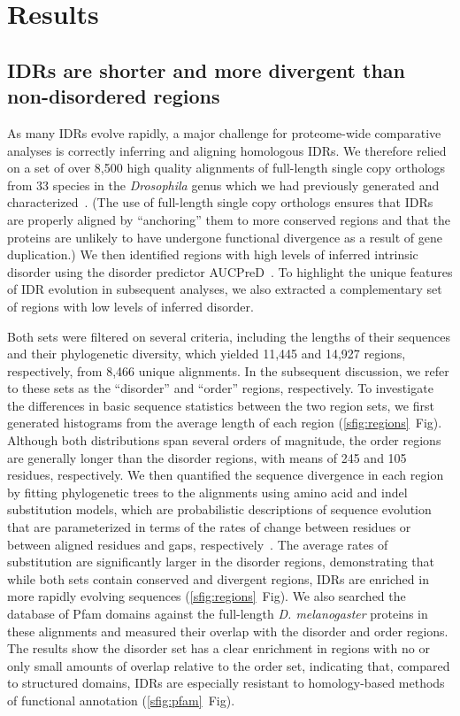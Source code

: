 \section{Results}
\subsection{IDRs are shorter and more divergent than non-disordered regions}
As many IDRs evolve rapidly, a major challenge for proteome-wide comparative analyses is correctly inferring and aligning homologous IDRs. We therefore relied on a set of over 8,500 high quality alignments of full-length single copy orthologs from 33 species in the \textit{Drosophila} genus which we had previously generated and characterized~\cite{Singleton2023}. (The use of full-length single copy orthologs ensures that IDRs are properly aligned by ``anchoring'' them to more conserved regions and that the proteins are unlikely to have undergone functional divergence as a result of gene duplication.) We then identified regions with high levels of inferred intrinsic disorder using the disorder predictor AUCPreD~\cite{Wang2016}. To highlight the unique features of IDR evolution in subsequent analyses, we also extracted a complementary set of regions with low levels of inferred disorder.

Both sets were filtered on several criteria, including the lengths of their sequences and their phylogenetic diversity, which yielded 11,445 and 14,927 regions, respectively, from 8,466 unique alignments. In the subsequent discussion, we refer to these sets as the ``disorder'' and ``order'' regions, respectively. To investigate the differences in basic sequence statistics between the two region sets, we first generated histograms from the average length of each region (\ref{sfig:regions}~Fig). Although both distributions span several orders of magnitude, the order regions are generally longer than the disorder regions, with means of 245 and 105 residues, respectively. We then quantified the sequence divergence in each region by fitting phylogenetic trees to the alignments using amino acid and indel substitution models, which are probabilistic descriptions of sequence evolution that are parameterized in terms of the rates of change between residues or between aligned residues and gaps, respectively~\cite{Kapli2020}. The average rates of substitution are significantly larger in the disorder regions, demonstrating that while both sets contain conserved and divergent regions, IDRs are enriched in more rapidly evolving sequences (\ref{sfig:regions}~Fig). We also searched the database of Pfam domains against the full-length \textit{D. melanogaster} proteins in these alignments and measured their overlap with the disorder and order regions. The results show the disorder set has a clear enrichment in regions with no or only small amounts of overlap relative to the order set, indicating that, compared to structured domains, IDRs are especially resistant to homology-based methods of functional annotation (\ref{sfig:pfam}~Fig).

